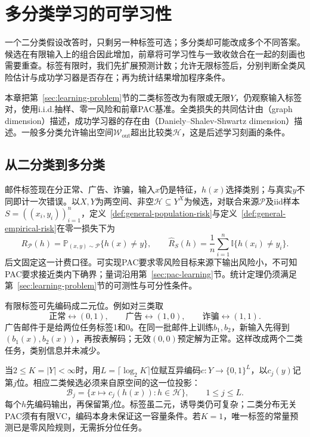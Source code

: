 \chapter{多分类学习的可学习性}
\label{chap:multiclass-learnability}

一个二分类假设改答时，只剩另一种标签可选；多分类却可能改成多个不同答案。候选在有限输入上的组合因此增加，前章将可学习性与一致收敛合在一起的刻画也需要重查。标签有限时，我们先扩展预测计数；允许无限标签后，分别判断全类风险估计与成功学习器是否存在；再为统计结果增加程序条件。

本章把第~\ref{sec:learning-problem}节的二类标签改为有限或无限$Y$，仍观察输入标签对，使用i.i.d.抽样、零一风险和前章PAC基准。全类损失的共同估计由（graph dimension）描述，成功学习器的存在由（Daniely--Shalev-Shwartz dimension）描述。一般多分类允许输出空间$\mathcal W_{\mathrm{out}}$超出比较类$\mathcal H$，这是后述学习刻画的条件。

\section{从二分类到多分类}
\label{sec:multiclass-setting}

邮件标签现在分正常、广告、诈骗，输入$x$仍是特征，$h(x)$选择类别；与真实$y$不同即计一次错误。以$X,Y$为两空间、非空$\mathcal H\subseteq Y^X$为候选，对联合来源$\mathcal P$及iid样本$S=((x_i,y_i))_{i=1}^n$，定义~\ref{def:general-population-risk}与定义~\ref{def:general-empirical-risk}在零一损失下为
\begin{equation}
 R_{\mathcal P}(h)=\mathbb P_{(x,y)\sim\mathcal P}\{h(x)\neq y\},\qquad
 \hat R_S(h)=\frac1n\sum_{i=1}^n\mathbb I\{h(x_i)\neq y_i\}.
 \label{eq:multiclass-risk}
\end{equation}
后文固定这一计费口径。可实现PAC要求零风险目标来源下输出风险小，不可知PAC要求接近类内下确界；量词沿用第~\ref{sec:pac-learning}节。统计定理仍须满足第~\ref{sec:learning-problem}节的可测性与可分性条件。

有限标签可先编码成二元位。例如对三类取
\[
 \text{正常}\longleftrightarrow(0,1),\qquad
 \text{广告}\longleftrightarrow(1,0),\qquad
 \text{诈骗}\longleftrightarrow(1,1).
\]
广告邮件于是给两位任务标签1和0。在同一批邮件上训练$b_1,b_2$，新输入先得到$(b_1(x),b_2(x))$，再按表解码；无效$(0,0)$预定解为正常。这样改成两个二类任务，类别信息并未减少。

当$2\leq K=|Y|<\infty$时，用$L=\lceil\log_2K\rceil$位赋互异编码$c:Y\to\{0,1\}^L$，以$c_j(y)$记第$j$位。相应二类候选必须来自原空间的这一位投影：
\[
 \mathcal B_j=\{x\mapsto c_j(h(x)):h\in\mathcal H\},\qquad 1\leq j\leq L.
\]
每个$h$先编码输出，再保留第$j$位。标签虽二元，诱导类仍可复杂；二类分布无关PAC须有有限VC，编码本身未保证这一容量条件。若$K=1$，唯一标签的常量预测已是零风险规则，无需拆分位任务。

